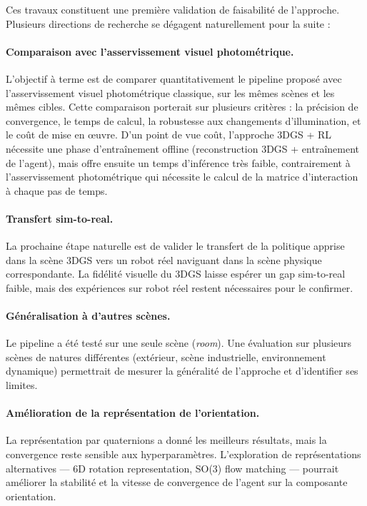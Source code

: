 Ces travaux constituent une première 
validation de faisabilité de l'approche. Plusieurs directions de recherche se dégagent naturellement pour la suite :

\paragraph{Comparaison avec l'asservissement visuel photométrique.}
L'objectif à terme est de comparer quantitativement le pipeline proposé 
avec l'asservissement visuel photométrique classique, sur les mêmes 
scènes et les mêmes cibles. Cette comparaison porterait sur plusieurs 
critères : la précision de convergence, le temps de calcul, la 
robustesse aux changements d'illumination, et le coût de mise en 
œuvre. D'un point de vue coût, l'approche 3DGS + RL nécessite une 
phase d'entraînement offline (reconstruction 3DGS + entraînement de 
l'agent), mais offre ensuite un temps d'inférence très faible, 
contrairement à l'asservissement photométrique qui nécessite le calcul 
de la matrice d'interaction à chaque pas de temps.

\paragraph{Transfert sim-to-real.}
La prochaine étape naturelle est de valider le transfert de la politique 
apprise dans la scène 3DGS vers un robot réel naviguant dans la scène 
physique correspondante. La fidélité visuelle du 3DGS laisse espérer 
un gap sim-to-real faible, mais des expériences sur robot réel restent 
nécessaires pour le confirmer.

\paragraph{Généralisation à d'autres scènes.}
Le pipeline a été testé sur une seule scène (\textit{room}). Une 
évaluation sur plusieurs scènes de natures différentes (extérieur, 
scène industrielle, environnement dynamique) permettrait de mesurer 
la généralité de l'approche et d'identifier ses limites.

\paragraph{Amélioration de la représentation de l'orientation.}
La représentation par quaternions a donné les meilleurs résultats, 
mais la convergence reste sensible aux hyperparamètres. L'exploration 
de représentations alternatives — 6D rotation representation, 
SO(3) flow matching — pourrait améliorer la stabilité et la vitesse 
de convergence de l'agent sur la composante orientation.

